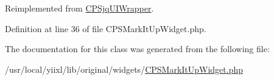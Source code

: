 Reimplemented from \hyperlink{classCPSjqUIWrapper_ae357f9dc377f7de0d12010b2ced28cbc}{CPSjqUIWrapper}.



Definition at line 36 of file CPSMarkItUpWidget.php.



The documentation for this class was generated from the following file:\begin{DoxyCompactItemize}
\item 
/usr/local/yiixl/lib/original/widgets/\hyperlink{CPSMarkItUpWidget_8php}{CPSMarkItUpWidget.php}\end{DoxyCompactItemize}
